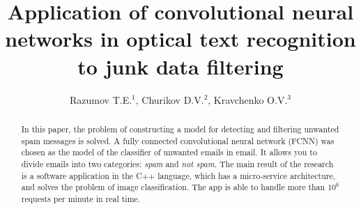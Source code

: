 \documentclass[12pt]{jpconf}
\begin{document}
\title{Application of convolutional neural networks in optical text recognition to junk data filtering}
\author{Razumov T.E.$^1$, Churikov D.V.$^2$, Kravchenko O.V.$^3$}

\address{
$^1$\,Mail.ru Group, Leningradsky pr., 39--79, Moscow, 125167, Russian Federation\\
$^2$\,Scientific and Technological Centre of Unique Instrumentation, Butlerova str., 15, Moscow, 117342, Russian Federation\\
$^3$\,Federal Research Center ``Computer Science and Control'' of RAS, Vavilova st., 40, Moscow, 119333, Russian Federation
}



\begin{abstract}
	In this paper, the problem of constructing a model for detecting and filtering unwanted spam messages is solved. A fully connected convolutional neural network ({FCNN}) was chosen as the model of the classifier of unwanted emails in email. It allows you to divide emails into two categories: \emph{spam} and \emph{not spam}.
	The main result of the research is a software application in the \textsf{C++} language, which has a micro-service architecture, and solves the problem of image classification. The app is able to handle more than $10 ^ 6 $ requests per minute in real time.
\end{abstract}

\end{document}
